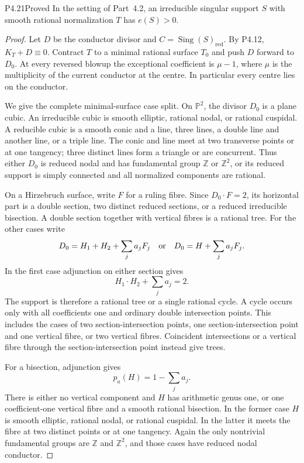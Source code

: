 \begin{statement}{P4.21}{Proved}
In the setting of Part~4.2, an irreducible singular support $S$
with smooth rational normalization $T$ has $e(S)>0$.
\end{statement}
\begin{proof}
Let $D$ be the conductor divisor and
$C=\operatorname{Sing}(S)_{\mathrm{red}}$. By P4.12,
$K_T+D\equiv0$. Contract $T$ to a minimal rational surface
$T_0$ and push $D$ forward to $D_0$. At every reversed
blowup the exceptional coefficient is $\mu-1$, where
$\mu$ is the multiplicity of the current conductor at the
centre. In particular every centre lies on the conductor.

We give the complete minimal-surface case split. On
$\mathbb P^2$, the divisor $D_0$ is a plane cubic. An
irreducible cubic is smooth elliptic, rational nodal, or
rational cuspidal. A reducible cubic is a smooth conic
and a line, three lines, a double line and another line,
or a triple line. The conic and line meet at two
transverse points or at one tangency; three distinct
lines form a triangle or are concurrent. Thus either
$D_0$ is reduced nodal and has fundamental group
$\mathbb Z$ or $\mathbb Z^2$, or its reduced support is
simply connected and all normalized components are
rational.

On a Hirzebruch surface, write $F$ for a ruling fibre.
Since $D_0\cdot F=2$, its horizontal part is a double
section, two distinct reduced sections, or a reduced
irreducible bisection. A double section together with
vertical fibres is a rational tree. For the other cases
write
\[
 D_0=H_1+H_2+\sum_j a_jF_j
 \quad\hbox{or}\quad
 D_0=H+\sum_j a_jF_j.
\]
In the first case adjunction on either section gives
\[
 H_1\cdot H_2+\sum_j a_j=2.
\]
The support is therefore a rational tree or a single
rational cycle. A cycle occurs only with all coefficients
one and ordinary double intersection points. This
includes the cases of two section-intersection points,
one section-intersection point and one vertical fibre,
or two vertical fibres. Coincident intersections or a
vertical fibre through the section-intersection point
instead give trees.

For a bisection, adjunction gives
\[
 p_a(H)=1-\sum_j a_j.
\]
There is either no vertical component and $H$ has
arithmetic genus one, or one coefficient-one vertical
fibre and a smooth rational bisection. In the former
case $H$ is smooth elliptic, rational nodal, or rational
cuspidal. In the latter it meets the fibre at two distinct
points or at one tangency. Again the only nontrivial
fundamental groups are $\mathbb Z$ and $\mathbb Z^2$,
and those cases have reduced nodal conductor.


\end{proof}
